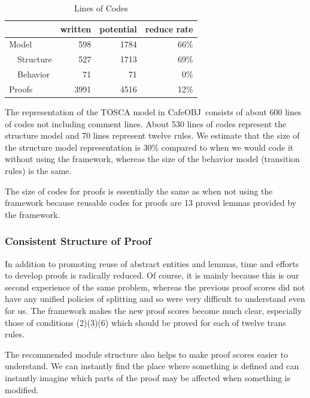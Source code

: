 \documentclass[12pt]{report}
\newcommand{\cafeobj}{{\sf CafeOBJ}~}
\begin{document}
\begin{table}[hbtp]
  \caption{Lines of Codes}
  \label{table:LOC}
  \centering
  \begin{tabular}{llrrr}
    \hline
       & & written  & potential & reduce rate \\
    \hline \hline
    \multicolumn{2}{l}{Model} & 598 & 1784 & 66\% \\
    & Structure  & 527 & 1713 & 69\%  \\
    & Behavior  & 71 & 71 & 0\% \\
    \hline
    \multicolumn{2}{l}{Proofs} & 3991 & 4516 & 12\% \\
    \hline
  \end{tabular}
\end{table}

The representation of the TOSCA model in \cafeobj consists of about
600 lines of codes not including comment lines. About 530 lines of codes
represent the structure model and 70 lines represent twelve rules. We
estimate that the size of the structure model representation is 30\%
compared to when we would code it without using the framework, whereas
the size of the behavior model (transition rules) is the same.

The size of codes for proofs is essentially the same as when not using
the framework because reusable codes for proofs are 13 proved lemmas
provided by the framework. 

\subsubsection{Consistent Structure of Proof}
In addition to promoting reuse of abstract entities and lemmas, time
and efforts to develop proofs is radically reduced. Of course, it is
mainly because this is our second experience of the same problem,
whereas the previous proof scores did not have any unified policies of
splitting and so were very difficult to understand even for us. The
framework makes the new proof scores become much clear, especially
those of conditions (2)(3)(6) which should be proved for each of
twelve trans rules.

The recommended module structure also helps to make proof scores easier
to understand.  We can instantly find the place where something is
defined and can instantly imagine which parts of the proof may be
affected when something is modified.
\end{document}
